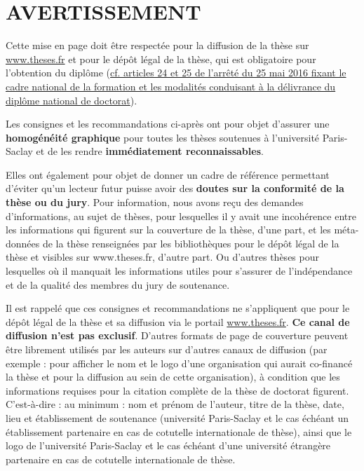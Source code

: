 \documentclass[french,12pt,a4paper]{book}
\begin{document}
\chapter{AVERTISSEMENT}
Cette mise en page doit être respectée pour la diffusion de la thèse sur \url{www.theses.fr} et pour le dépôt légal de la thèse, qui est obligatoire pour l’obtention du diplôme (\href{https://www.legifrance.gouv.fr/affichTexte.do?cidTexte=JORFTEXT000032587086&dateTexte=20160902}{cf. articles 24 et 25 de l’arrêté du 25 mai 2016 fixant le cadre national de la formation et les modalités conduisant à la délivrance du diplôme national de doctorat}).\\ \par
Les consignes et les recommandations ci-après ont pour objet d’assurer une \textbf{homogénéité graphique} pour toutes les thèses soutenues à l’université Paris-Saclay et de les rendre \textbf{immédiatement reconnaissables}.\\ \par
Elles ont également pour objet de donner un cadre de référence permettant d’éviter qu’un lecteur futur puisse avoir des \textbf{doutes sur la conformité de la thèse ou du jury}. Pour information, nous avons reçu des demandes d’informations, au sujet de thèses, pour lesquelles il y avait une incohérence entre les informations qui figurent sur la couverture de la thèse, d’une part, et les méta-données de la thèse renseignées par les bibliothèques pour le dépôt légal de la thèse et visibles sur www.theses.fr, d’autre part. Ou d’autres thèses pour lesquelles où il manquait les informations utiles pour s’assurer de l’indépendance et de la qualité des membres du jury de soutenance.\\ \par
Il est rappelé que ces consignes et recommandations ne s’appliquent que pour le dépôt légal de la thèse et sa diffusion via le portail \url{www.theses.fr}. \textbf{Ce canal de diffusion n’est pas exclusif}. D’autres formats de page de couverture peuvent être librement utilisés par les auteurs sur d’autres canaux de diffusion (par exemple : pour afficher le nom et le logo d’une organisation qui aurait co-financé la thèse et pour la diffusion au sein de cette organisation), à condition que les informations requises pour la citation complète de la thèse de doctorat figurent. C’est-à-dire : au minimum : nom et prénom de l’auteur, titre de la thèse, date, lieu et établissement de soutenance (université Paris-Saclay et le cas échéant un établissement partenaire en cas de cotutelle internationale de thèse), ainsi que le logo de l’université Paris-Saclay et le cas échéant d’une université étrangère partenaire en cas de cotutelle internationale de thèse.
\end{document}

